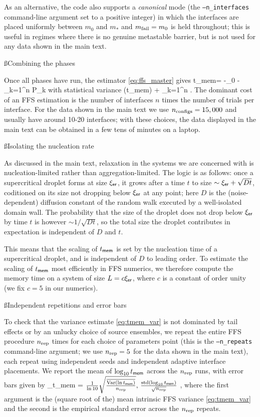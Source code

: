 \documentclass[12pt]{article}
\newcommand{\ler}{\ell_{\sf er}}
\newcommand{\tmem}{t_{\sf mem}}
\renewcommand{\ler}{{\xi_{\sf er}}}
\begin{document}
As an alternative, the code also supports a {\it canonical} mode (the \texttt{--n\_interfaces} command-line argument set to a positive integer) in which the interfaces are placed uniformly between $m_0$ and $m_*$ and $m_{\rm fail} = m_0$ is held throughout; this is useful in regimes where there is no genuine metastable barrier, but is not used for any data shown in the main text.


\ss{Combining the phases}

Once all phases have run, the estimator \eqref{eq:ffs_master} gives
\be \label{eq:tmem_estimator} \log \tmem = -\log \Phi_0 - \sum_{k=1}^n \log P_k\ee
with statistical variance
\be \label{eq:tmem_var} (\ln \tmem) \approx {} + \sum_{k=1}^n .\ee
The dominant cost of an FFS estimation is the number of interfaces $n$ times the number of trials per interface. For the data shown in the main text we use $n_{\rm configs} = 15,000$ and usually have around 10-20 interfaces; with these choices, the data displayed in the main text can be obtained in a few tens of minutes on a laptop. 

\ss{Isolating the nucleation rate} \label{ss:isolating_nucleation_rate} 

As discussed in the main text, relaxation in the systems we are concerned with is nucleation-limited rather than aggregation-limited. 
The logic is as follows: once a supercritical droplet forms at size $\ler$, it grows after a time $t$ to size $\sim \ler + \sqrt{D t}$, coditioned on its size not dropping below $\ler$ at any point; here $D$ is the (noise-dependent) diffusion constant of the random walk executed by a well-isolated domain wall. The probability that the size of the droplet does not drop below $\ler$ by time $t$ is however $\sim 1/\sqrt{D t}$, so the total size the droplet contributes in expectation is independent of $D$ and $t$. 

This means that the scaling of $\tmem$ is set by the nucleation time of a supercritical droplet, and is independent of $D$ to leading order. 
To estimate the scaling of $\tmem$ most efficiently in FFS numerics, we therefore compute the memory time on a system of size $L = c \ler$, where $c$ is a constant of order unity (we fix $c = 5$ in our numerics). 

\ss{Independent repetitions and error bars}

To check that the variance estimate \eqref{eq:tmem_var} is not dominated by tail effects or by an unlucky choice of source ensembles, we repeat the entire FFS procedure $n_{\rm rep}$ times for each choice of parameters point (this is the \texttt{--n\_repeats} command-line argument; we use $n_{\rm rep} =5$ for the data shown in the main text), each repeat using independent seeds and independent adaptive interface placements. We report the mean of $\log_{10} \tmem$ across the $n_{\rm rep}$ runs, with error bars given by
\be \sigma_{\log \tmem} = \max \( \frac{1}{\ln 10}\sqrt{ \frac{\overline{\mathrm{Var}(\ln \tmem)}}{n_{\rm rep}} }, \, \frac{\mathrm{std}(\log_{10} \tmem)}{\sqrt{n_{\rm rep}}} \) ,\ee
where the first argument is the (square root of the) mean intrinsic FFS variance \eqref{eq:tmem_var}  and the second is the empirical standard error across the $n_{\rm rep}$ repeats. 
\end{document}
